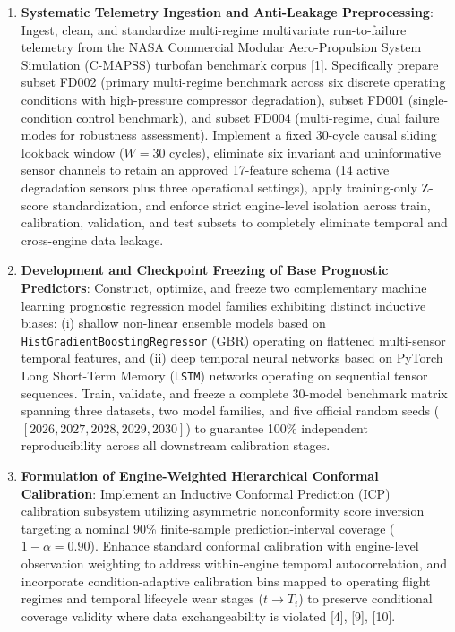 \documentclass[12pt,a4paper]{article}
\begin{document}
\begin{enumerate}
    \item \textbf{Systematic Telemetry Ingestion and Anti-Leakage Preprocessing}: Ingest, clean, and standardize multi-regime multivariate run-to-failure telemetry from the NASA Commercial Modular Aero-Propulsion System Simulation (C-MAPSS) turbofan benchmark corpus [1]. Specifically prepare subset FD002 (primary multi-regime benchmark across six discrete operating conditions with high-pressure compressor degradation), subset FD001 (single-condition control benchmark), and subset FD004 (multi-regime, dual failure modes for robustness assessment). Implement a fixed 30-cycle causal sliding lookback window ($W = 30$ cycles), eliminate six invariant and uninformative sensor channels to retain an approved 17-feature schema (14 active degradation sensors plus three operational settings), apply training-only Z-score standardization, and enforce strict engine-level isolation across train, calibration, validation, and test subsets to completely eliminate temporal and cross-engine data leakage.
    
    \item \textbf{Development and Checkpoint Freezing of Base Prognostic Predictors}: Construct, optimize, and freeze two complementary machine learning prognostic regression model families exhibiting distinct inductive biases: (i) shallow non-linear ensemble models based on \texttt{HistGradientBoostingRegressor} (GBR) operating on flattened multi-sensor temporal features, and (ii) deep temporal neural networks based on PyTorch Long Short-Term Memory (\texttt{LSTM}) networks operating on sequential tensor sequences. Train, validate, and freeze a complete 30-model benchmark matrix spanning three datasets, two model families, and five official random seeds ($[2026, 2027, 2028, 2029, 2030]$) to guarantee 100\% independent reproducibility across all downstream calibration stages.
    
    \item \textbf{Formulation of Engine-Weighted Hierarchical Conformal Calibration}: Implement an Inductive Conformal Prediction (ICP) calibration subsystem utilizing asymmetric nonconformity score inversion targeting a nominal 90\% finite-sample prediction-interval coverage ($1 - \alpha = 0.90$). Enhance standard conformal calibration with engine-level observation weighting to address within-engine temporal autocorrelation, and incorporate condition-adaptive calibration bins mapped to operating flight regimes and temporal lifecycle wear stages ($t \to T_i$) to preserve conditional coverage validity where data exchangeability is violated [4], [9], [10].
    

\end{enumerate}
\end{document}
